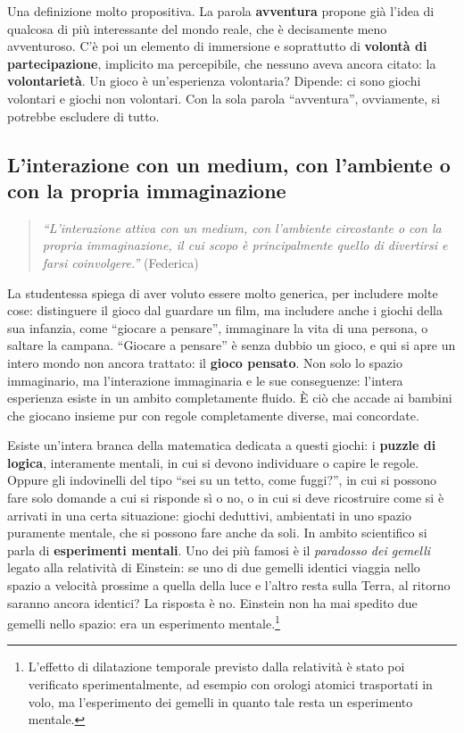 Una definizione molto propositiva. La parola \textbf{avventura} propone già
l'idea di qualcosa di più interessante del mondo reale, che è decisamente meno
avventuroso. C'è poi un elemento di immersione e soprattutto di
\textbf{volontà di partecipazione}, implicito ma percepibile, che nessuno aveva
ancora citato: la \textbf{volontarietà}. Un gioco è un'esperienza volontaria?
Dipende: ci sono giochi volontari e giochi non volontari. Con la sola parola
``avventura'', ovviamente, si potrebbe escludere di tutto.

\subsection{L'interazione con un medium, con l'ambiente o con la propria immaginazione}

\begin{quote}
\emph{``L'interazione attiva con un medium, con l'ambiente circostante o con la
propria immaginazione, il cui scopo è principalmente quello di divertirsi e
farsi coinvolgere.''} (Federica)
\end{quote}

La studentessa spiega di aver voluto essere molto generica, per includere
molte cose: distinguere il gioco dal guardare un film, ma includere anche i
giochi della sua infanzia, come ``giocare a pensare'', immaginare la vita di
una persona, o saltare la campana. ``Giocare a pensare'' è senza dubbio un
gioco, e qui si apre un intero mondo non ancora trattato: il
\textbf{gioco pensato}. Non solo lo spazio immaginario, ma l'interazione
immaginaria e le sue conseguenze: l'intera esperienza esiste in un ambito
completamente fluido. È ciò che accade ai bambini che giocano insieme pur con
regole completamente diverse, mai concordate.

Esiste un'intera branca della matematica dedicata a questi giochi: i
\textbf{puzzle di logica}, interamente mentali, in cui si devono individuare
o capire le regole. Oppure gli indovinelli del tipo ``sei su un tetto, come
fuggi?'', in cui si possono fare solo domande a cui si risponde sì o no, o in
cui si deve ricostruire come si è arrivati in una certa situazione: giochi
deduttivi, ambientati in uno spazio puramente mentale, che si possono fare
anche da soli. In ambito scientifico si parla di \textbf{esperimenti
mentali}. Uno dei più famosi è il \emph{paradosso dei gemelli} legato alla
relatività di Einstein: se uno di due gemelli identici viaggia nello spazio a
velocità prossime a quella della luce e l'altro resta sulla Terra, al ritorno
saranno ancora identici? La risposta è no. Einstein non ha mai spedito due
gemelli nello spazio: era un esperimento mentale.\footnote{L'effetto di
dilatazione temporale previsto dalla relatività è stato poi verificato
sperimentalmente, ad esempio con orologi atomici trasportati in volo, ma
l'esperimento dei gemelli in quanto tale resta un esperimento mentale.}

